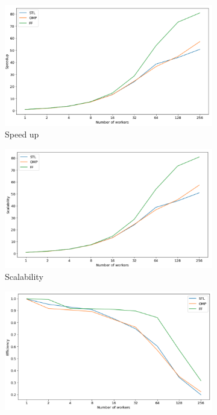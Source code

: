 \documentclass[12pt,a4paper]{report}
\begin{document}
\begin{figure}
     \centering
     \begin{subfigure}[b]{0.45\textwidth}
         \centering
         \includegraphics[width=\textwidth]{images/main-50k/speedup.png}
         \caption{Speed up}
         \label{fig:y equals x}
     \end{subfigure}
     \hfill
     \begin{subfigure}[b]{0.45\textwidth}
         \centering
         \includegraphics[width=\textwidth]{images/main-50k/scalability.png}
         \caption{Scalability}
         \label{fig:three sin x}
     \end{subfigure}
     \hfill
     \begin{subfigure}[b]{0.45\textwidth}
         \centering
         \includegraphics[width=\textwidth]{images/main-50k/efficiency.png}

\end{subfigure}
\end{figure}
\end{document}
